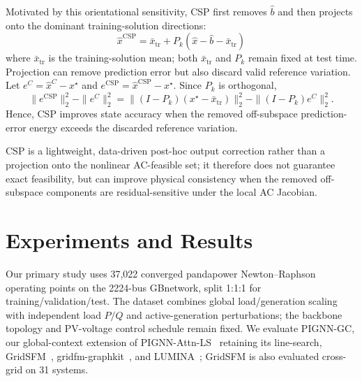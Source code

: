 \documentclass{article}
\begin{document}
Motivated by this orientational sensitivity, CSP first removes $\hat{b}$ and then projects onto the dominant training-solution directions:
\begin{equation}
\boxed{
\hat x^{\mathrm{CSP}}
=
\bar x_{\mathrm{tr}}
+
P_k\left(\hat x-\hat b-\bar x_{\mathrm{tr}}\right)
}
\label{eq:csp}
\end{equation}
where $\bar x_{\mathrm{tr}}$ is the training-solution mean;
both $\bar x_{\mathrm{tr}}$ and $P_k$ remain fixed at test time.
Projection can remove prediction error but also discard valid reference
variation. Let
$e^C=\hat x^C-x^\star$ and
$e^{\mathrm{CSP}}=\hat x^{\mathrm{CSP}}-x^\star$.
Since $P_k$ is orthogonal,
\begin{equation}
\|e^{\mathrm{CSP}}\|_2^2-\|e^C\|_2^2
=
\|(I-P_k)(x^\star-\bar x_{\mathrm{tr}})\|_2^2
-\|(I-P_k)e^C\|_2^2 .
\label{eq:tradeoff}
\end{equation}
Hence, CSP improves state accuracy when the removed off-subspace
prediction-error energy exceeds the discarded reference variation.

CSP is a lightweight, data-driven post-hoc output correction rather than a projection onto the nonlinear AC-feasible set; it therefore does not guarantee exact feasibility, but can improve physical consistency when the removed off-subspace components are residual-sensitive under the local AC Jacobian.




\section{Experiments and Results}
\label{sec:experiments}

Our primary study uses 37,022 converged pandapower Newton--Raphson
operating points on the 2224-bus GBnetwork, split 1:1:1 for
training/validation/test. The dataset combines global load/generation
scaling with independent load $P/Q$ and active-generation perturbations;
the backbone topology and PV-voltage control schedule remain fixed.
We evaluate PIGNN-GC, our global-context extension of
PIGNN-Attn-LS~\cite{kim2026pignn} retaining its line-search, GridSFM~\cite{yang2026gridsfm},
gridfm-graphkit~\cite{gridfmgraphkit2026}, and
LUMINA~\cite{li2026lumina}; GridSFM is also evaluated
cross-grid on 31 systems.
\end{document}
